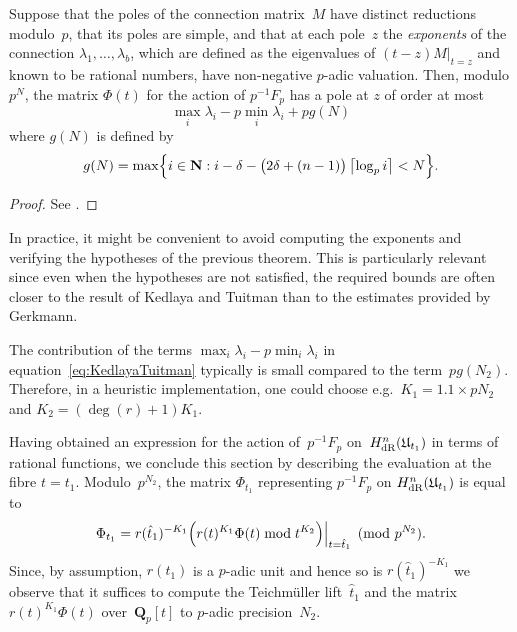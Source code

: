 \begin{thm} \label{thm:KedlayaTuitman}
Suppose that the poles of the connection matrix~$M$ have distinct 
reductions modulo~$p$, that its poles are simple, and that at each 
pole~$z$ the \emph{exponents} of the connection $\lambda_1, \dotsc, \lambda_b$,
which are defined as the eigenvalues of $(t-z) M \vert_{t=z}$ and known to be 
rational numbers, have non-negative $p$-adic valuation.  Then, modulo $p^N$, 
the matrix $\Phi(t)$ for the action of $p^{-1} F_p$ has a pole at $z$ of order 
at most 
\begin{equation} \label{eq:KedlayaTuitman}
\max_{i} \lambda_i - p \min_{i} \lambda_i + p g(N)
\end{equation}
where $g(N)$ is defined by 
\begin{equation}
g(N) = \max\Bigl\{ i \in \mathbf{N} : i - \delta - \bigl(2\delta + (n-1)\bigr) \left\lceil\log_p i\right\rceil < N \Bigr\}.
\end{equation}
\end{thm}

\begin{proof}
See \citep[Theorem~2.1]{KedlayaTuitman2012}.
\end{proof}

\begin{rem} \label{rem:KedlayaTuitman}
In practice, it might be convenient to avoid computing the exponents and 
verifying the hypotheses of the previous theorem.  This is particularly 
relevant since even when the hypotheses are not satisfied, the required 
bounds are often closer to the result of Kedlaya and Tuitman than to the 
estimates provided by Gerkmann.

The contribution of the terms $\max_i \lambda_i - p \min_i \lambda_i$ 
in equation~\eqref{eq:KedlayaTuitman} typically is small compared to the 
term~$p g(N_2)$. Therefore, in a heuristic implementation, one 
could choose e.g.\ $K_1 = 1.1 \times p N_2$ and $K_2 = (\deg(r) + 1) K_1$.
\end{rem}

Having obtained an expression for the action of~$p^{-1} F_p$ 
on~$H_{\text{dR}}^{n}(\mathfrak{U}_{t_1})$ in terms of rational functions, 
we conclude this section by describing the evaluation at the fibre 
$t = t_1$.  Modulo~$p^{N_2}$, the matrix $\Phi_{t_1}$ representing 
$p^{-1} F_p$ on $H_{\text{dR}}^{n}(\mathfrak{U}_{t_1})$ is equal to 
\begin{equation}
\Phi_{t_1} = 
    r(\hat{t}_1)^{-K_1} 
    \Bigl( r(t)^{K_1} \Phi(t) \bmod{t^{K_2}} \Bigr) \Big\vert_{t=\hat{t}_1} \pmod{p^{N_2}}.
\end{equation}
Since, by assumption, $r(t_1)$ is a $p$-adic unit and hence so is 
$r(\hat{t}_1)^{-K_1}$ we observe that it suffices to compute the 
Teichm\"uller lift~$\hat{t}_1$ and the matrix~$r(t)^{K_1} \Phi(t)$ 
over~$\mathbf{Q}_p[t]$ to $p$-adic precision~$N_2$.

